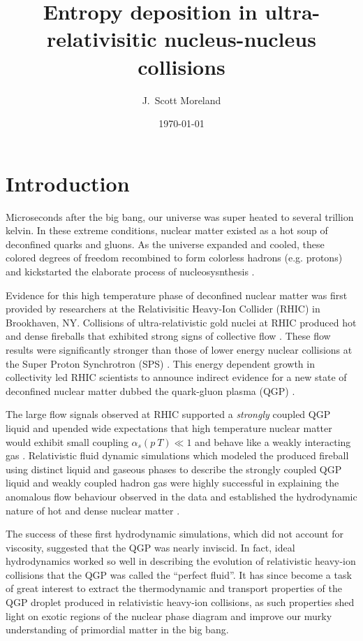 \documentclass[aps,prc,reprint,amsmath,nofootinbib]{revtex4-1}
\begin{document}
\title{Entropy deposition in ultra-relativisitic nucleus-nucleus collisions}

\author{J.\ Scott Moreland}
\date{\today}

\maketitle

\section{Introduction}

Microseconds after the big bang, our universe was super heated to several trillion kelvin. In these extreme conditions, nuclear matter existed as a hot 
soup of deconfined quarks and gluons. As the universe expanded and cooled, these colored degrees of freedom recombined to form colorless hadrons 
(e.g. protons) and kickstarted the elaborate process of nucleosysnthesis \cite{Heinz:2004qz}.

Evidence for this high temperature phase of deconfined nuclear matter was first provided by researchers at the Relativisitic Heavy-Ion Collider (RHIC) 
in Brookhaven, NY. Collisions of ultra-relativistic gold nuclei at RHIC produced hot and dense fireballs that exhibited strong signs of collective flow 
\cite{Adams:2005dq}. These flow results were significantly stronger than those of lower energy nuclear collisions at the Super Proton Synchrotron (SPS) 
\cite{Shuryak:2004cy}. This energy dependent growth in collectivity led RHIC scientists to announce indirect evidence for a new state of deconfined nuclear 
matter dubbed the quark-gluon plasma (QGP) \cite{BNL}.

The large flow signals observed at RHIC supported a \emph{strongly} coupled QGP liquid and upended wide expectations that high temperature nuclear matter 
would exhibit small coupling $\alpha_s(p~T) \ll 1$ and behave like a weakly interacting gas \cite{Shuryak:2004cy}. Relativistic fluid dynamic simulations which modeled 
the produced fireball using distinct liquid and gaseous phases to describe the strongly coupled QGP liquid and weakly coupled hadron gas were highly successful in 
explaining the anomalous flow behaviour observed in the data and established the hydrodynamic nature of hot and dense nuclear matter \cite{Kolb:2003dz}.

The success of these first hydrodynamic simulations, which did not account for viscosity, suggested that the QGP was nearly inviscid. In fact, ideal hydrodynamics 
worked so well in describing the evolution of relativistic heavy-ion collisions that the QGP was called the ``perfect fluid''. It has since become a task of great 
interest to extract the thermodynamic and transport properties of the QGP droplet produced in relativistic heavy-ion collisions, as such properties shed light on
exotic regions of the nuclear phase diagram and improve our murky understanding of primordial matter in the big bang.
\end{document}
